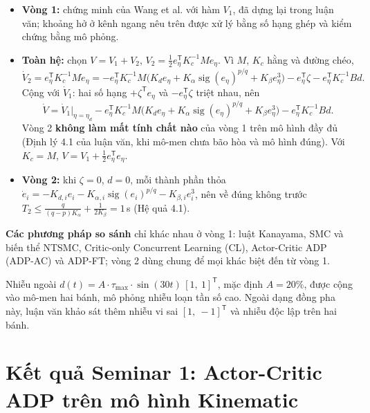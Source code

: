 \documentclass[12pt,a4paper]{article}
\newcommand{\T}{\mathsf{T}}
\begin{document}
\begin{itemize}
    \item \textbf{Vòng 1:} chứng minh của Wang et al. với hàm $V_1$, đã dựng lại trong luận văn; khoảng hở ở kênh ngang nêu trên được xử lý bằng số hạng ghép và kiểm chứng bằng mô phỏng.
    \item \textbf{Toàn hệ:} chọn $V = V_1 + V_2$, $V_2 = \frac12 e_\eta^\T K_c^{-1}Me_\eta$. Vì $M$, $K_c$ hằng và đường chéo,
    \begin{equation*}
        \dot V_2 = e_\eta^\T K_c^{-1}M\dot e_\eta = -e_\eta^\T K_c^{-1}M\big(K_d e_\eta + K_\alpha\operatorname{sig}(e_\eta)^{p/q} + K_\beta e_\eta^3\big) - e_\eta^\T\zeta - e_\eta^\T K_c^{-1}Bd .
    \end{equation*}
    Cộng với $\dot V_1$: hai số hạng $+\zeta^\T e_\eta$ và $-e_\eta^\T\zeta$ triệt nhau, nên
    \begin{equation*}
        \dot V = \dot V_1\big|_{\eta=\eta_d} - e_\eta^\T K_c^{-1}M\big(K_d e_\eta + K_\alpha\operatorname{sig}(e_\eta)^{p/q} + K_\beta e_\eta^3\big) - e_\eta^\T K_c^{-1}Bd .
    \end{equation*}
    Vòng 2 \textbf{không làm mất tính chất nào} của vòng 1 trên mô hình đầy đủ (Định lý 4.1 của luận văn, khi mô-men chưa bão hòa và mô hình đúng). Với $K_c = M$, $V = V_1 + \frac12 e_\eta^\T e_\eta$.
    \item \textbf{Vòng 2:} khi $\zeta = 0$, $d = 0$, mỗi thành phần thỏa $\dot e_i = -K_{d,i}e_i - K_{\alpha,i}\operatorname{sig}(e_i)^{p/q} - K_{\beta,i}e_i^3$, nên về đúng không trước $T_2 \leq \frac{q}{(q-p)K_\alpha} + \frac{1}{2K_\beta} = 1$\,s (Hệ quả 4.1).
\end{itemize}

\textbf{Các phương pháp so sánh} chỉ khác nhau ở vòng 1: luật Kanayama, SMC và biến thể NTSMC, Critic-only Concurrent Learning (CL), Actor-Critic ADP (ADP-AC) và ADP-FT; vòng 2 dùng chung để mọi khác biệt đến từ vòng 1.

Nhiễu ngoài $d(t) = A \cdot \tau_\text{max} \cdot \sin(30t)\,[1,\ 1]^\T$, mặc định $A = 20\%$, được cộng vào mô-men hai bánh, mô phỏng nhiễu loạn tần số cao. Ngoài dạng đồng pha này, luận văn khảo sát thêm nhiễu vi sai $[1,\ -1]^\T$ và nhiễu độc lập trên hai bánh.

\section{Kết quả Seminar 1: Actor-Critic ADP trên mô hình Kinematic}
\end{document}
